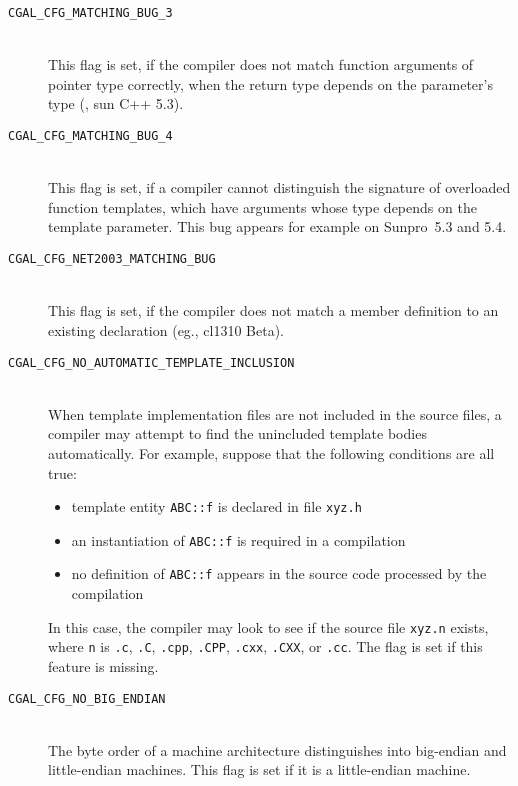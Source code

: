 \begin{description}
\item[{\tt CGAL\_CFG\_MATCHING\_BUG\_3}]~\\
 This flag is set, if the compiler does not match function arguments
 of pointer type correctly, when the return type depends on the
 parameter's type (\eg, sun C++ 5.3).

\item[{\tt CGAL\_CFG\_MATCHING\_BUG\_4}]~\\
 This flag is set, if a compiler cannot distinguish the signature of
 overloaded function templates, which have arguments whose type
 depends on the template parameter.  This bug appears for example on
 Sunpro~5.3 and 5.4.

\item[{\tt CGAL\_CFG\_NET2003\_MATCHING\_BUG}]~\\
 This flag is set, if the compiler does not match a member definition
 to an existing declaration (eg., cl1310 Beta).

\item[{\tt CGAL\_CFG\_NO\_AUTOMATIC\_TEMPLATE\_INCLUSION}]~\\
 When template implementation files are not included in the source files,
 a compiler may attempt to find the unincluded template bodies
 automatically. For example, suppose that the following conditions are
 all true:
 \begin{itemize}
 \item template entity {\tt ABC::f} is declared in file {\tt xyz.h}
 \item an instantiation of {\tt ABC::f} is required in a compilation
 \item no definition of {\tt ABC::f} appears in the source code processed by
       the compilation
 \end{itemize}
 In this case, the compiler may look to see if the source file {\tt xyz.n}
 exists, where {\tt n} is {\tt .c}, {\tt .C}, {\tt .cpp}, {\tt .CPP}, 
 {\tt .cxx}, {\tt .CXX}, or {\tt .cc}. The flag
 is set if this feature is missing.
 
\item[{\tt CGAL\_CFG\_NO\_BIG\_ENDIAN}]~\\
  The byte order of a machine architecture distinguishes into
  big-endian and little-endian machines.  This flag is
  set if it is a little-endian machine.
 

\end{description}
